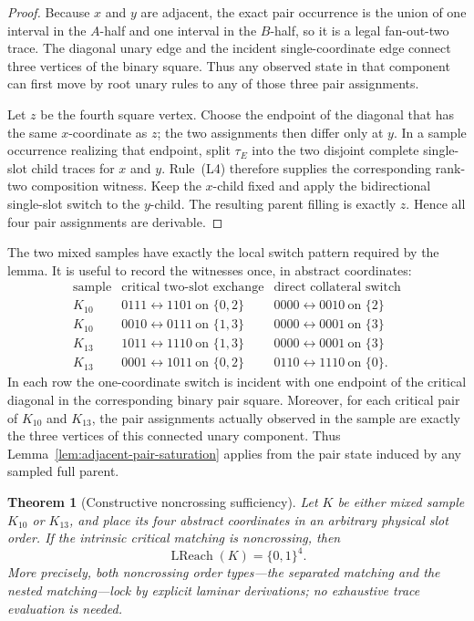 \documentclass[11pt]{article}
\newtheorem{theorem}[definition]{Theorem}
\begin{document}
\begin{proof}
Because $x$ and $y$ are adjacent, the exact pair occurrence is the union of
one interval in the $A$-half and one interval in the $B$-half, so it is a
legal fan-out-two trace.  The diagonal unary edge and the incident
single-coordinate edge connect three vertices of the binary square.  Thus any
observed state in that component can first move by root unary rules to any of
those three pair assignments.

Let $z$ be the fourth square vertex.  Choose the endpoint of the diagonal that
has the same $x$-coordinate as $z$; the two assignments then differ only at
$y$.  In a sample occurrence realizing that endpoint, split $\tau_E$ into the
two disjoint complete single-slot child traces for $x$ and $y$.  Rule~(L4)
therefore supplies the corresponding rank-two composition witness.  Keep the
$x$-child fixed and apply the bidirectional single-slot switch to the
$y$-child.  The resulting parent filling is exactly $z$.  Hence all four pair
assignments are derivable.
\end{proof}

The two mixed samples have exactly the local switch pattern required by the
lemma.  It is useful to record the witnesses once, in abstract coordinates:
\[
\begin{array}{c|c|c}
\text{sample} & \text{critical two-slot exchange} & \text{direct collateral switch}\\
\hline
K_{10} & 0111\leftrightarrow1101\ \text{on }\{0,2\}
       & 0000\leftrightarrow0010\ \text{on }\{2\}\\
K_{10} & 0010\leftrightarrow0111\ \text{on }\{1,3\}
       & 0000\leftrightarrow0001\ \text{on }\{3\}\\
K_{13} & 1011\leftrightarrow1110\ \text{on }\{1,3\}
       & 0000\leftrightarrow0001\ \text{on }\{3\}\\
K_{13} & 0001\leftrightarrow1011\ \text{on }\{0,2\}
       & 0110\leftrightarrow1110\ \text{on }\{0\}.
\end{array}
\]
In each row the one-coordinate switch is incident with one endpoint of the
critical diagonal in the corresponding binary pair square.  Moreover, for each
critical pair of $K_{10}$ and $K_{13}$, the pair assignments actually observed
in the sample are exactly the three vertices of this connected unary component.
Thus Lemma~\ref{lem:adjacent-pair-saturation} applies from the pair state
induced by any sampled full parent.

\begin{theorem}[Constructive noncrossing sufficiency]
\label{thm:noncrossing-constructive}
Let $K$ be either mixed sample $K_{10}$ or $K_{13}$, and place its four
abstract coordinates in an arbitrary physical slot order.  If the intrinsic
critical matching is noncrossing, then
\[
  \boxed{\operatorname{LReach}(K)=\{0,1\}^4.}
\]
More precisely, both noncrossing order types---the separated matching and the
nested matching---lock by explicit laminar derivations; no exhaustive trace
evaluation is needed.
\end{theorem}
\end{document}
